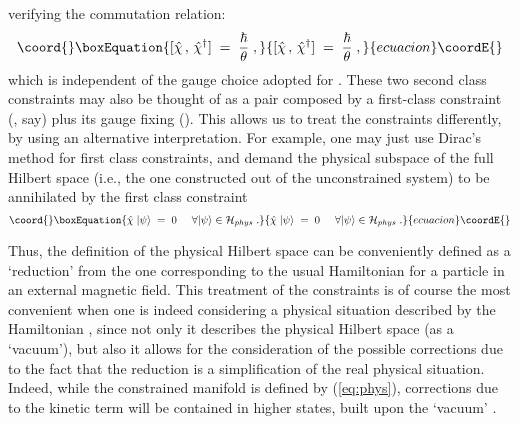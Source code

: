 \documentclass[a4paper,12pt]{article}
\begin{document}
verifying the commutation relation:
\begin{equation}\coord{}\boxEquation{
  \label{eq:const3}
[{\hat \chi}\,,\, {\hat \chi}^\dagger ] \;=\; \frac{\hbar}{\theta}
\;,
}{
  [{\hat \chi}\,,\, {\hat \chi}^\dagger ] \;=\; \frac{\hbar}{\theta}
\;,
}{ecuacion}\coordE{}\end{equation}
which is independent of the gauge choice adopted for \coordHE{}.  These
two
second class constraints may also be thought of as a pair composed
by
a first-class constraint (\myHighlight{${\hat \chi}$}\coordHE{}, say) plus its gauge fixing
(\myHighlight{${\hat \chi}^\dagger$}\coordHE{}). This allows us to treat the constraints
differently,
by using an alternative interpretation. For example, one may just
use
Dirac's method for first class constraints, and demand the physical
subspace \coordHE{} of the full Hilbert space \coordHE{} (i.e., the one constructed out of the unconstrained system)
to
be annihilated by the first class constraint
\begin{equation}\coord{}\boxEquation{
  \label{eq:phys}
{\hat \chi} \; | \psi \rangle \;=\; 0  \;\;\;\;\; \forall |\psi
\rangle 
\in {\mathcal H}_{phys} \;. 
}{
  {\hat \chi} \; | \psi \rangle \;=\; 0  \;\;\;\;\; \forall |\psi
\rangle 
\in {\mathcal H}_{phys} \;. 
}{ecuacion}\coordE{}\end{equation}

Thus, the definition of the physical Hilbert space can be
conveniently
defined as a `reduction' from the one corresponding to the usual
Hamiltonian for a particle in an external magnetic field. This
treatment of the constraints is of course the most convenient when
one
is indeed considering a physical situation described by the
Hamiltonian \coordHE{}, since not only it describes the physical
Hilbert space (as a `vacuum'), but also it allows for the
consideration of the possible corrections due to the fact that the
reduction is a simplification of the real physical situation.
Indeed,
while the constrained manifold is defined by (\ref{eq:phys}),
corrections due to the kinetic term will be contained in higher
states, built upon the `vacuum' \coordHE{}.
\end{document}
